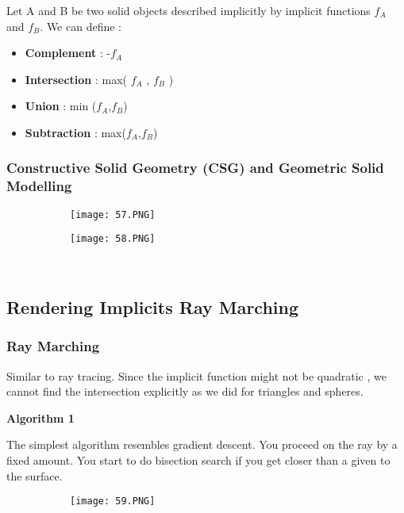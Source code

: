 \documentclass{article}
\begin{document}
Let A and B be two solid objects described implicitly by implicit functions $f_A$ and $f_B$.
We can define : 
\begin{itemize}
    \item \textbf{Complement} : -$f_A$ 
    \item \textbf{Intersection} : max( $f_A$ , $f_B$ ) 
    \item \textbf{Union} : min ($f_A$,$f_B$)
    \item \textbf{Subtraction} : max($f_A$,$f_B$)
\end{itemize}


\subsubsection{Constructive Solid Geometry (CSG) and Geometric Solid Modelling }

\begin{figure}[ht!]
  \centering
  \begin{subfigure}[b]{0.29\linewidth}
    \texttt{[image: 57.PNG]}
  \end{subfigure}
  \begin{subfigure}[b]{0.3\textwidth}
         \centering
         \texttt{[image: 58.PNG]}
     \end{subfigure}
\end{figure}


\
\subsection{Rendering Implicits Ray Marching}
\subsubsection{Ray Marching}

Similar to ray tracing.
Since the implicit function might not be quadratic , we cannot find the intersection explicitly as we did for triangles and spheres.

\vspace{3mm}
\textbf{Algorithm 1}

The simplest algorithm resembles gradient descent.
You proceed on the ray by a fixed amount.
You start to do bisection search if you get closer than a given to the surface.

\begin{figure}[ht!]
  \centering
  \begin{subfigure}[b]{0.4\linewidth}
    \texttt{[image: 59.PNG]}
  \end{subfigure}
\end{figure}
\end{document}
